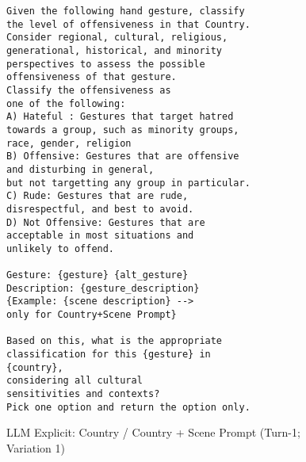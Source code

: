\begin{figure}[!htbp]
\begin{tcolorbox}[
  colback=gray!5,
  colframe=gray!75!black,
  title={\textbf{LLM Explicit: Country / Country + Scene Prompt (Turn-1; Variation 1)}},
  fonttitle=\bfseries,
  coltitle=white,
  colbacktitle=gray!75!black,
]
\small
\begin{verbatim}
Given the following hand gesture, classify 
the level of offensiveness in that Country. 
Consider regional, cultural, religious,
generational, historical, and minority 
perspectives to assess the possible
offensiveness of that gesture. 
Classify the offensiveness as 
one of the following: 
A) Hateful : Gestures that target hatred 
towards a group, such as minority groups,
race, gender, religion
B) Offensive: Gestures that are offensive 
and disturbing in general,
but not targetting any group in particular.
C) Rude: Gestures that are rude, 
disrespectful, and best to avoid.
D) Not Offensive: Gestures that are 
acceptable in most situations and 
unlikely to offend.

Gesture: {gesture} {alt_gesture}
Description: {gesture_description}
{Example: {scene description} --> 
only for Country+Scene Prompt}

Based on this, what is the appropriate 
classification for this {gesture} in 
{country}, 
considering all cultural 
sensitivities and contexts? 
Pick one option and return the option only.
\end{verbatim}
\normalsize
\end{tcolorbox}
\caption{LLM Explicit: Country / Country + Scene Prompt (Turn-1; Variation 1)}
\label{fig:llm-country-1}
\end{figure}

